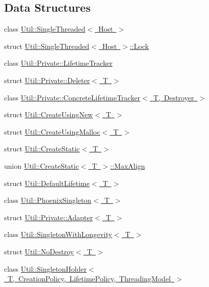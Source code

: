 \subsection*{Data Structures}
\begin{DoxyCompactItemize}
\item 
class \mbox{\hyperlink{classUtil_1_1SingleThreaded}{Util\+::\+Single\+Threaded$<$ Host $>$}}
\item 
struct \mbox{\hyperlink{structUtil_1_1SingleThreaded_1_1Lock}{Util\+::\+Single\+Threaded$<$ Host $>$\+::\+Lock}}
\item 
class \mbox{\hyperlink{classUtil_1_1Private_1_1LifetimeTracker}{Util\+::\+Private\+::\+Lifetime\+Tracker}}
\item 
struct \mbox{\hyperlink{structUtil_1_1Private_1_1Deleter}{Util\+::\+Private\+::\+Deleter$<$ T $>$}}
\item 
class \mbox{\hyperlink{classUtil_1_1Private_1_1ConcreteLifetimeTracker}{Util\+::\+Private\+::\+Concrete\+Lifetime\+Tracker$<$ T, Destroyer $>$}}
\item 
struct \mbox{\hyperlink{structUtil_1_1CreateUsingNew}{Util\+::\+Create\+Using\+New$<$ T $>$}}
\item 
struct \mbox{\hyperlink{structUtil_1_1CreateUsingMalloc}{Util\+::\+Create\+Using\+Malloc$<$ T $>$}}
\item 
struct \mbox{\hyperlink{structUtil_1_1CreateStatic}{Util\+::\+Create\+Static$<$ T $>$}}
\item 
union \mbox{\hyperlink{unionUtil_1_1CreateStatic_1_1MaxAlign}{Util\+::\+Create\+Static$<$ T $>$\+::\+Max\+Align}}
\item 
struct \mbox{\hyperlink{structUtil_1_1DefaultLifetime}{Util\+::\+Default\+Lifetime$<$ T $>$}}
\item 
class \mbox{\hyperlink{classUtil_1_1PhoenixSingleton}{Util\+::\+Phoenix\+Singleton$<$ T $>$}}
\item 
struct \mbox{\hyperlink{structUtil_1_1Private_1_1Adapter}{Util\+::\+Private\+::\+Adapter$<$ T $>$}}
\item 
class \mbox{\hyperlink{classUtil_1_1SingletonWithLongevity}{Util\+::\+Singleton\+With\+Longevity$<$ T $>$}}
\item 
struct \mbox{\hyperlink{structUtil_1_1NoDestroy}{Util\+::\+No\+Destroy$<$ T $>$}}
\item 
class \mbox{\hyperlink{classUtil_1_1SingletonHolder}{Util\+::\+Singleton\+Holder$<$ T, Creation\+Policy, Lifetime\+Policy, Threading\+Model $>$}}
\end{DoxyCompactItemize}
